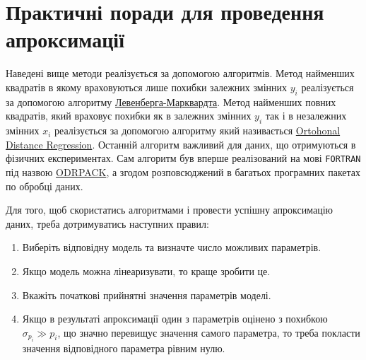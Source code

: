 \documentclass{LabBook}
\begin{document}


\section{Практичні поради для проведення апроксимації}


  Наведені вище методи реалізується за допомогою алгоритмів. Метод найменших квадратів в якому враховуються лише похибки залежних змінних $y_i$ реалізується за допомогою алгоритму \href{https://en.wikipedia.org/wiki/Levenberg–Marquardt_algorithm}{Левенберга-Марквардта}. Метод найменших повних квадратів, який враховує похибки як в залежних змінних $y_i$ так і в незалежних змінних $x_i$  реалізується за допомогою алгоритму який називається \href{https://en.wikipedia.org/wiki/Total_least_squares}{Ortohonal Distance Regression}. Останній алгоритм важливий для даних, що отримуються в фізичних експериментах. Сам алгоритм був вперше реалізований на мові \texttt{FORTRAN} під назвою \href{https://dl.acm.org/doi/10.1145/1268776.1268782}{ODRPACK}, а згодом розповсюджений  в багатьох програмних пакетах по обробці даних.

  Для того, щоб скористатись алгоритмами і провести успішну апроксимацію даних, треба дотримуватись наступних правил:
  \begin{enumerate}
    \item Виберіть відповідну модель та визначте число можливих параметрів.
    \item Якщо модель можна лінеаризувати, то краще зробити це.
    \item Вкажіть початкові прийнятні значення параметрів моделі.
    \item Якщо в результаті апроксимації один з параметрів оцінено з похибкою $\sigma_{p_i} \gg p_i$, що значно перевищує значення самого параметра, то треба покласти значення відповідного параметра рівним нулю.
  \end{enumerate}
\end{document}
